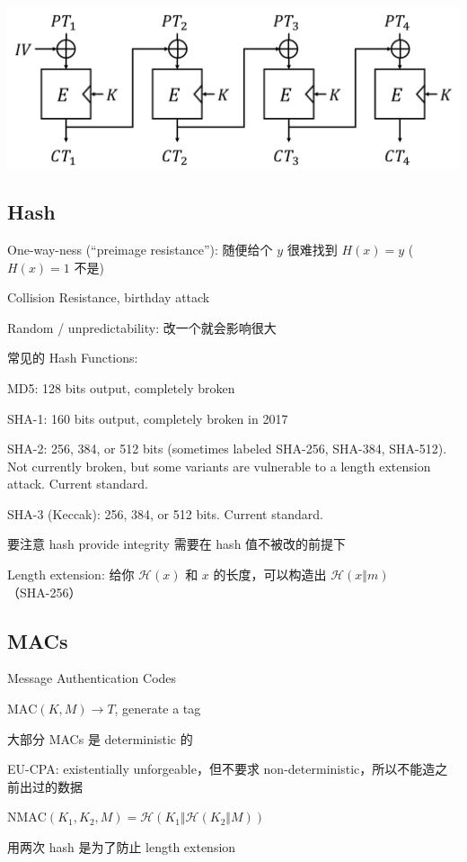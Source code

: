\documentclass[9pt,landscape]{article}
\begin{document}
\begin{multicols}{2}
\includegraphics[width=\columnwidth]{imgs/CBC}

\subsection{Hash}

One-way-ness (``preimage resistance''): 随便给个 $y$ 很难找到 $H(x)=y$ ($H(x)=1$ 不是)

Collision Resistance, birthday attack

Random / unpredictability: 改一个就会影响很大

常见的 Hash Functions:

MD5: 128 bits output, completely broken

SHA-1: 160 bits output, completely broken in 2017

SHA-2: 256, 384, or 512 bits (sometimes labeled SHA-256, SHA-384, SHA-512). Not currently broken, but some variants are vulnerable to a length extension attack. Current standard.

SHA-3 (Keccak): 256, 384, or 512 bits. Current standard.

要注意 hash provide integrity 需要在 hash 值不被改的前提下

Length extension: 给你 $\mathcal{H}(x)$ 和 $x$ 的长度，可以构造出 $\mathcal{H}(x\Vert m)$（SHA-256）

\subsection{MACs}

Message Authentication Codes

$\mathrm{MAC}(K, M)\to T$, generate a tag

大部分 MACs 是 deterministic 的

EU-CPA: existentially unforgeable，但不要求 non-deterministic，所以不能造之前出过的数据

$\mathrm{NMAC}(K_1, K_2, M) = \mathcal{H}(K_1\Vert \mathcal{H}(K_2\Vert M))$

用两次 hash 是为了防止 length extension


\end{multicols}
\end{document}
